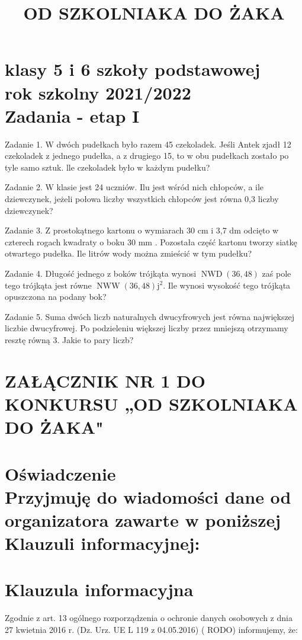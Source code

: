 \documentclass[10pt]{article}
\title{OD SZKOLNIAKA DO ŻAKA }
\author{}
\date{}
\begin{document}
\maketitle
\section*{klasy 5 i 6 szkoły podstawowej \\
 rok szkolny 2021/2022 \\
 Zadania - etap I}
Zadanie 1. W dwóch pudełkach było razem 45 czekoladek. Jeśli Antek zjadł 12 czekoladek z jednego pudełka, a z drugiego 15, to w obu pudełkach zostało po tyle samo sztuk. lle czekoladek było w każdym pudełku?

Zadanie 2. W klasie jest 24 uczniów. Ilu jest wśród nich chłopców, a ile dziewczynek, jeżeli połowa liczby wszystkich chłopców jest równa 0,3 liczby dziewczynek?

Zadanie 3. Z prostokątnego kartonu o wymiarach 30 cm i 3,7 dm odcięto w czterech rogach kwadraty o boku 30 mm . Pozostała część kartonu tworzy siatkę otwartego pudełka. Ile litrów wody można zmieścić w tym pudełku?

Zadanie 4. Długość jednego z boków trójkąta wynosi \(\operatorname{NWD}(36,48)\) zaś pole tego trójkąta jest równe \(\operatorname{NWW}(36,48) \mathrm{j}^{2}\). Ile wynosi wysokość tego trójkąta opuszczona na podany bok?

Zadanie 5. Suma dwóch liczb naturalnych dwucyfrowych jest równa największej liczbie dwucyfrowej. Po podzieleniu większej liczby przez mniejszą otrzymamy resztę równą 3. Jakie to pary liczb?

\section*{ZAŁĄCZNIK NR 1 DO KONKURSU „OD SZKOLNIAKA DO ŻAKA"}
\section*{Oświadczenie \\
 Przyjmuję do wiadomości dane od organizatora zawarte w poniższej Klauzuli informacyjnej:}
\section*{Klauzula informacyjna}
Zgodnie z art. 13 ogólnego rozporządzenia o ochronie danych osobowych z dnia 27 kwietnia 2016 r. (Dz. Urz. UE L 119 z 04.05.2016) ( RODO) informujemy, że:
\end{document}
